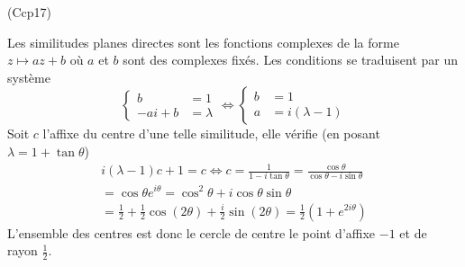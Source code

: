 \begin{tiny}(Ccp17)\end{tiny} Les similitudes planes directes sont les fonctions complexes de la forme $z\mapsto az +b$ où $a$ et $b$ sont des complexes fixés. Les conditions se traduisent par un système
\begin{displaymath}
  \left\lbrace 
  \begin{aligned}
    b&= 1 \\ -ai + b &= \lambda
  \end{aligned}
\right. \Leftrightarrow
  \left\lbrace 
  \begin{aligned}
    b&= 1 \\ a &= i(\lambda-1)
  \end{aligned} \right.
\end{displaymath}
Soit $c$ l'affixe du centre d'une telle similitude, elle vérifie (en posant $\lambda = 1 +\tan \theta$)
\begin{multline*}
  i(\lambda -1) c +1= c \Leftrightarrow c = \frac{1}{1-i\tan \theta} = \frac{\cos \theta}{\cos \theta -i\sin \theta}\\
  = \cos \theta e^{i\theta} = \cos^2 \theta + i\cos \theta \sin \theta\\
  = \frac{1}{2} + \frac{1}{2}\cos(2\theta) +\frac{i}{2} \sin(2\theta)
  = \frac{1}{2}(1+e^{2i\theta})
\end{multline*}
L'ensemble des centres est donc le cercle de centre le point d'affixe $-1$ et de rayon $\frac{1}{2}$.